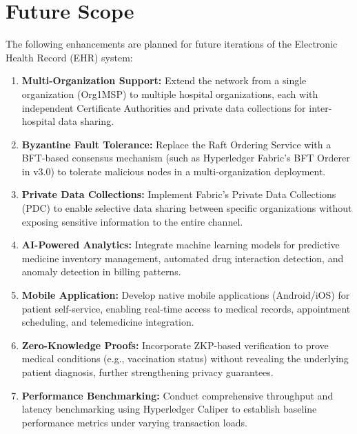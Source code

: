 \section{Future Scope}

The following enhancements are planned for future iterations of the Electronic Health Record (EHR) system:

\begin{enumerate}
    \item \textbf{Multi-Organization Support:} Extend the network from a single organization (Org1MSP) to multiple hospital organizations, each with independent Certificate Authorities and private data collections for inter-hospital data sharing.
    
    \item \textbf{Byzantine Fault Tolerance:} Replace the Raft Ordering Service with a BFT-based consensus mechanism (such as Hyperledger Fabric's BFT Orderer in v3.0) to tolerate malicious nodes in a multi-organization deployment.
    
    \item \textbf{Private Data Collections:} Implement Fabric's Private Data Collections (PDC) to enable selective data sharing between specific organizations without exposing sensitive information to the entire channel.
    
    \item \textbf{AI-Powered Analytics:} Integrate machine learning models for predictive medicine inventory management, automated drug interaction detection, and anomaly detection in billing patterns.
    
    \item \textbf{Mobile Application:} Develop native mobile applications (Android/iOS) for patient self-service, enabling real-time access to medical records, appointment scheduling, and telemedicine integration.
    
    \item \textbf{Zero-Knowledge Proofs:} Incorporate ZKP-based verification to prove medical conditions (e.g., vaccination status) without revealing the underlying patient diagnosis, further strengthening privacy guarantees.
    
    \item \textbf{Performance Benchmarking:} Conduct comprehensive throughput and latency benchmarking using Hyperledger Caliper to establish baseline performance metrics under varying transaction loads.
\end{enumerate}

